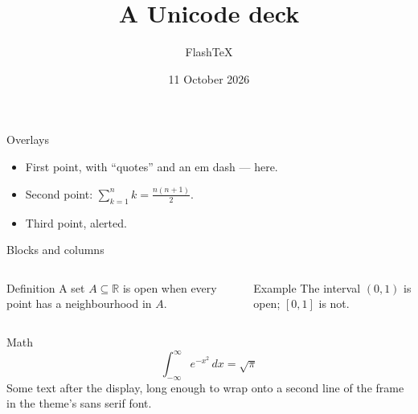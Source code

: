 \documentclass{beamer}
\title{A Unicode deck}
\author{FlashTeX}
\date{11 October 2026}
\begin{document}
\begin{frame}
  \titlepage
\end{frame}
\begin{frame}{Overlays}
  \begin{itemize}
    \item<1-> First point, with “quotes” and an em dash — here.
    \item<2-> Second point: $∑_{k=1}^{n} k = \frac{n(n+1)}{2}$.
    \item<3-> Third point, \alert{alerted}.
  \end{itemize}
\end{frame}
\begin{frame}{Blocks and columns}
  \begin{columns}
    \begin{block}{Definition}
      A set $A ⊆ ℝ$ is open when every point has a neighbourhood in $A$.
    \end{block}
    \begin{exampleblock}{Example}
      The interval $(0, 1)$ is open; $[0, 1]$ is not.
    \end{exampleblock}
  \end{columns}
\end{frame}
\begin{frame}{Math}
  \[ ∫_{-∞}^{∞} e^{-x^2}\,dx = \sqrt{π} \]
  Some text after the display, long enough to wrap onto a second line of
  the frame in the theme's sans serif font.
\end{frame}
\end{document}
